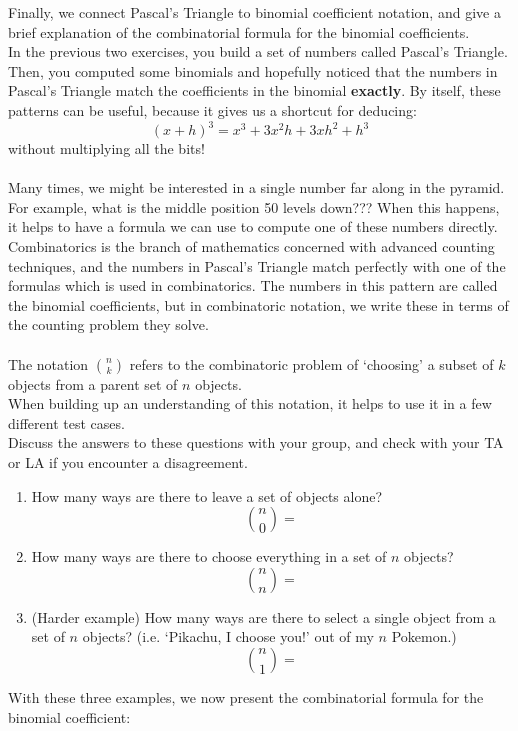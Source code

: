 \documentclass{ximera}
\begin{document}
\begin{exercise}
    Finally, we connect Pascal's Triangle to binomial coefficient notation, and give a brief explanation of the combinatorial formula for the binomial coefficients.  \\
    In the previous two exercises, you build a set of numbers called Pascal's Triangle.  Then, you computed some binomials and hopefully noticed that the numbers in Pascal's Triangle match the coefficients in the binomial \textbf{exactly}.  By itself, these patterns can be useful, because it gives us a shortcut for deducing:
    \[(x+h)^3=x^3+3x^2h+3xh^2+h^3\]
    without multiplying all the bits! \\
    \\
    Many times, we might be interested in a single number far along in the pyramid. For example, what is the middle position 50 levels down??? When this happens, it helps to have a formula we can use to compute one of these numbers directly.  Combinatorics is the branch of mathematics concerned with advanced counting techniques, and the numbers in Pascal's Triangle match perfectly with one of the formulas which is used in combinatorics.  The numbers in this pattern are called the binomial coefficients, but in combinatoric notation, we write these in terms of the counting problem they solve. \\
    \\
    The notation ${n \choose k}$ refers to the combinatoric problem of `choosing' a subset of $k$ objects from a parent set of $n$ objects.\\
    When building up an understanding of this notation, it helps to use it in a few different test cases. \\
    Discuss the answers to these questions with your group, and check with your TA or LA if you encounter a disagreement.
    \begin{enumerate}
        \item How many ways are there to leave a set of objects alone?
        \[{n\choose 0}=\]
        \item How many ways are there to choose everything in a set of $n$ objects?
        \[{n \choose n}=\]
        \item (Harder example) How many ways are there to select a single object from a set of $n$ objects? (i.e. `Pikachu, I choose you!' out of my $n$ Pokemon.)
        \[{n\choose 1}=\]
    \end{enumerate}
    With these three examples, we now present the combinatorial formula for the binomial coefficient:

\end{exercise}
\end{document}

